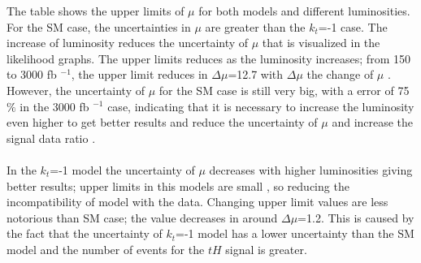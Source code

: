 \begin{linenumbers}
The table shows the upper limits of $\mu$ for both models and different luminosities. For the SM case, the uncertainties in $\mu$ are greater than the $k_t$=-1 case. The increase of luminosity reduces the uncertainty of $\mu$ that is visualized in the likelihood graphs. 
The upper limits reduces as the luminosity increases; from 150 to 3000 fb $^{-1}$, the upper limit reduces in $\Delta\mu$=12.7 with $\Delta\mu$ the change of $\mu$ .
However, the uncertainty of $\mu$ for the SM case is still very big, with a error of 75 $\%$ in the 3000 fb $^{-1}$ case, indicating that it is necessary to increase the luminosity even higher to get better results and reduce the uncertainty of $\mu$ and increase the signal data ratio . \\
\\
In the $k_t$=-1 model the uncertainty of $\mu$ decreases with higher luminosities  giving better results; upper limits in this models are small , so reducing the incompatibility of model with the data. Changing upper limit values are less notorious than SM case; the value decreases in around $\Delta \mu$=1.2. This is caused by the fact that the uncertainty of $k_t$=-1 model has a lower uncertainty than the SM model and the number of events for the $tH$ signal is greater. 
\end{linenumbers}

